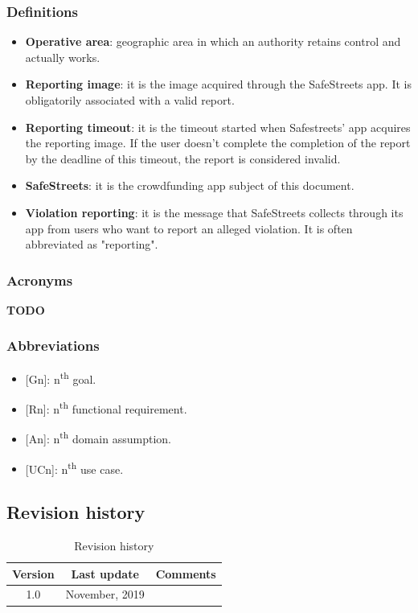 \documentclass{article}
\begin{document}
			\subsubsection{Definitions}
				\begin{itemize}
					\item \textbf{Operative area}: geographic area in which an authority retains  control and actually works.
					\item \textbf{Reporting image}: it is the image acquired through the SafeStreets app. It is obligatorily associated with a valid report.
					\item \textbf{Reporting timeout}: it is the timeout started when Safestreets' app acquires the reporting image. If the user doesn't complete the completion of the report by the deadline of this timeout, the report is considered invalid.
					\item \textbf{SafeStreets}: it is the crowdfunding app subject of this document.
					\item \textbf{Violation reporting}: it is the message that SafeStreets collects through its app from users who want to report an alleged violation. It is often abbreviated as "reporting".
				\end{itemize}
			\subsubsection{Acronyms}
			 \textbf{TODO}
			\subsubsection{Abbreviations}
				\begin{itemize}
					\item {[Gn]}: n\textsuperscript{th} goal.
					\item {[Rn]}: n\textsuperscript{th} functional requirement.
					\item {[An]}: n\textsuperscript{th} domain assumption.
					\item {[UCn]}: n\textsuperscript{th} use case.
				\end{itemize}
		\subsection{Revision history}
			\begin{table}[h]
				\centering
				\begin{tabular}{c c c}
					\hline
					\textbf{Version} & \textbf{Last update} & \textbf{Comments} \\ 
					\hline
					1.0 &  \nth{10} November, 2019  & \\
					\hline
				\end{tabular}
				\caption{Revision history}
				\label{fig:Revision history}
			\end{table}
\end{document}

